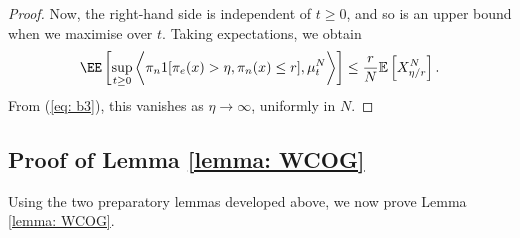 \begin{proof}
Now, the right-hand side is independent of $t \ge 0$, and so is an upper bound when we maximise over $t.$ Taking expectations, we obtain
\begin{equation}
\EE\left[\sup_{t\ge 0} \bigg\langle \pi_n 1[\pi_e(x)>\eta, \pi_n(x)\leq r], \mu^N_t\bigg\rangle \right]
\leq
\frac{r}{N} \mathbb{E}\left[X^N_{\eta/r}\right].
\end{equation}
From (\ref{eq: b3}), this vanishes as $\eta\rightarrow \infty$, uniformly in $N$.
\end{proof}


\subsection{Proof of Lemma \ref{lemma: WCOG}} Using the two preparatory lemmas developed above, we now prove Lemma \ref{lemma: WCOG}. 
